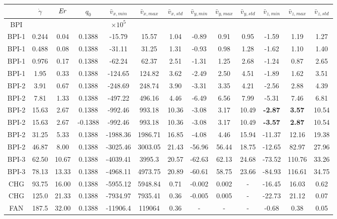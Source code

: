 \documentclass[8.5pt,twoside,twocolumn]{article}
\begin{document}
\begin{table}[htpb]
\begin{tabular}{|c||c|| c || c || c |c |c||c| c| c||c| c| c|}
\hline
& $\dot{\gamma}$ & ${\it Er}$ & $q_0$ & $\bar{v}_{x,min}$ & $\bar{v}_{x,max}$ & $\bar{v}_{x,std}$ & $\bar{v}_{y,min}$ & $\bar{v}_{y,max}$ & $\bar{v}_{y,std}$ & $\bar{v}_{z,min}$ & $\bar{v}_{z,max}$ & $\bar{v}_{z,std}$ \\
\hline
BPI & & & & $\times 10^5$\\
\hline
BPI-1 & 0.244 & 0.04& 0.1388 &-15.79 &15.57 &1.04 &-0.89 &0.91 &0.95 &-1.59 &1.19 &1.27 \\
BPI-1 & 0.488 & 0.08 & 0.1388 &-31.11 &31.25 &1.31 &-0.93 &0.98 &1.28 &-1.62 &1.10 &1.40 \\
BPI-1 & 0.976 & 0.17 & 0.1388 &-62.24 &62.37 &2.51 &-1.31 &1.25 &2.68 &-1.24 &0.87 &2.65 \\
BPI-1 & 1.95 & 0.33 & 0.1388 &-124.65 &124.82 &3.62&  -2.49 &2.50 &4.51 &-1.89 & 1.62 &3.51 \\
\hline
BPI-2 & 3.91 & 0.67 & 0.1388 &-248.69 &248.74 &3.90&  -3.31 &3.35 &4.21 &-2.56 & 2.88 &4.39 \\
BPI-2 & 7.81 & 1.33 & 0.1388 &-497.22 &496.16 &4.46 &-6.49 &6.56 &7.99 &-5.31 & 7.46 &6.81 \\ 
BPI-2 & 15.63 & 2.67 & 0.1388 &-992.46 &993.18 &10.36 &-3.08 &3.17 &10.49 &\bf{-2.87} & \bf{3.57} &10.54 \\
BPI-2 & 15.63 & 2.67 & -0.1388 &-992.46 &993.18 &10.36 &-3.08 &3.17 &10.49 &\bf{-3.57} & \bf{2.87} &10.54 \\
BPI-2 & 31.25 &5.33 & 0.1388 & -1988.36 &1986.71 &16.85 &-4.08 &4.46 &15.94 &-11.37 & 12.16 &19.38\\
BPI-2 & 46.87 & 8.00 & 0.1388 & -3025.46 & 3003.05 &21.43 & -56.96 & 56.44  & 18.75 & -12.65 & 82.97  & 27.96\\
\hline
BPI-3 & 62.50 & 10.67& 0.1388 & -4039.41 &3995.3  & 20.57 & -62.63 & 62.13 & 24.68 &-73.52 & 110.76 & 33.26 \\
BPI-3 &78.13 &13.33 & 0.1388 & -4968.11 &4973.75 &20.89 &-60.61 &58.75 &23.66 &-84.93 &116.61 &34.75 \\
\hline
CHG & 93.75 &16.00 & 0.1388 & -5955.12 &5948.84 & 0.71 & -0.002 & 0.002 & -  & -16.45 & 16.03 &0.62 \\
CHG & 125.0 & 21.33& 0.1388 & -7934.97 & 7935.41 & 0.36 & -0.005 & 0.005 & - &-22.73 & 21.12 & 0.07\\
\hline
FAN & 187.5 & 32.00& 0.1388 &-11906.4  &119064 &0.36 &- &- &- &-0.68 & 0.38 & 0.05\\
\hline


\end{tabular}
\end{table}
\end{document}
